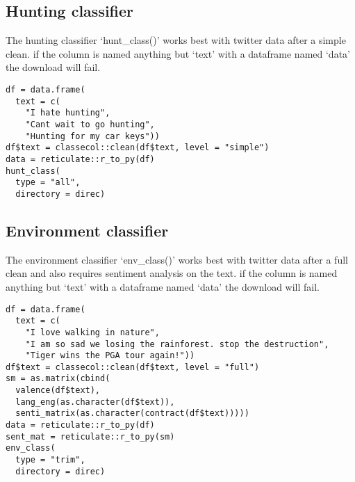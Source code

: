 \documentclass[]{article}
\begin{document}
\subsection{Hunting classifier}\label{hunting-classifier}

The hunting classifier `hunt\_class()' works best with twitter data
after a simple clean. if the column is named anything but `text' with a
dataframe named `data' the download will fail.

\begin{verbatim}
df = data.frame(
  text = c(
    "I hate hunting", 
    "Cant wait to go hunting", 
    "Hunting for my car keys"))
df$text = classecol::clean(df$text, level = "simple")
data = reticulate::r_to_py(df)
hunt_class(
  type = "all",
  directory = direc)
\end{verbatim}

\subsection{Environment classifier}\label{environment-classifier}

The environment classifier `env\_class()' works best with twitter data
after a full clean and also requires sentiment analysis on the text. if
the column is named anything but `text' with a dataframe named `data'
the download will fail.

\begin{verbatim}
df = data.frame(
  text = c(
    "I love walking in nature", 
    "I am so sad we losing the rainforest. stop the destruction", 
    "Tiger wins the PGA tour again!"))
df$text = classecol::clean(df$text, level = "full")
sm = as.matrix(cbind(
  valence(df$text), 
  lang_eng(as.character(df$text)), 
  senti_matrix(as.character(contract(df$text)))))
data = reticulate::r_to_py(df)
sent_mat = reticulate::r_to_py(sm)
env_class(
  type = "trim",
  directory = direc)
\end{verbatim}
\end{document}
